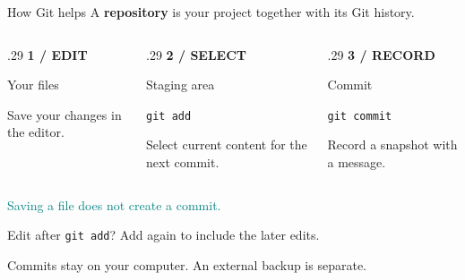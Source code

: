 \documentclass[aspectratio=169]{beamer}
\newcommand{\labeltext}[1]{{\color{Teal}\fontsize{13}{17}\selectfont\bfseries #1}}
\newcommand{\smalltext}[1]{{\fontsize{18}{24}\selectfont #1}}
\begin{document}
\begin{frame}[t]{How Git helps}
\smalltext{A \textbf{repository} is your project together with its Git history.}\par
\vspace{11mm}
\begin{columns}[T,onlytextwidth]
\begin{column}{.29\textwidth}
\labeltext{1 / EDIT}\par\vspace{4mm}
{\fontsize{26}{32}\selectfont Your files}\par\vspace{5mm}
\smalltext{Save your changes in the editor.}
\end{column}
\begin{column}{.29\textwidth}
\labeltext{2 / SELECT}\par\vspace{4mm}
{\fontsize{26}{32}\selectfont Staging area}\par\vspace{5mm}
\smalltext{\texttt{git add}\par Select current content for the next commit.}
\end{column}
\begin{column}{.29\textwidth}
\labeltext{3 / RECORD}\par\vspace{4mm}
{\fontsize{26}{32}\selectfont Commit}\par\vspace{5mm}
\smalltext{\texttt{git commit}\par Record a snapshot with a message.}
\end{column}
\end{columns}
\vspace{10mm}
\textcolor{Teal}{Saving a file does not create a commit.}\par
\vspace{3mm}
\smalltext{Edit after \texttt{git add}? Add again to include the later edits.}\par
\vfill
{\color{Muted}\fontsize{16}{21}\selectfont Commits stay on your computer. An external backup is separate.}\par
\vspace{6mm}
\end{frame}
\end{document}
